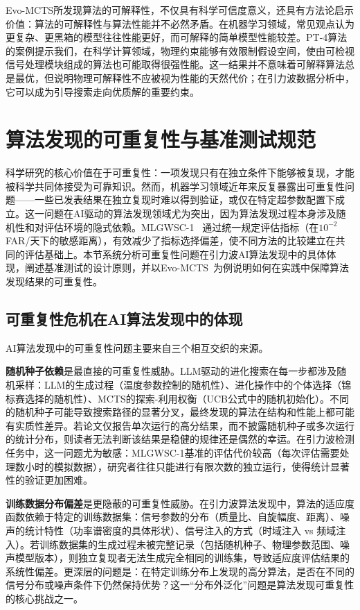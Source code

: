 Evo-MCTS所发现算法的可解释性，不仅具有科学可信度意义，还具有方法论启示价值：算法的可解释性与算法性能并不必然矛盾。在机器学习领域，常见观点认为更复杂、更黑箱的模型往往性能更好，而可解释的简单模型性能较差。PT-4算法的案例提示我们，在科学计算领域，物理约束能够有效限制假设空间，使由可检视信号处理模块组成的算法也可能取得很强性能。这一结果并不意味着可解释算法总是最优，但说明物理可解释性不应被视为性能的天然代价；在引力波数据分析中，它可以成为引导搜索走向优质解的重要约束。

\section{算法发现的可重复性与基准测试规范}

科学研究的核心价值在于可重复性：一项发现只有在独立条件下能够被复现，才能被科学共同体接受为可靠知识。然而，机器学习领域近年来反复暴露出可重复性问题——一些已发表结果在独立复现时难以得到验证，或仅在特定超参数配置下成立。这一问题在AI驱动的算法发现领域尤为突出，因为算法发现过程本身涉及随机性和对评估环境的隐式依赖。MLGWSC-1~\cite{schafer2023mlgwsc1} 通过统一规定评估指标（在$10^{-2}$ FAR/天下的敏感距离），有效减少了指标选择偏差，使不同方法的比较建立在共同的评估基础上。本节系统分析可重复性问题在引力波AI算法发现中的具体体现，阐述基准测试的设计原则，并以Evo-MCTS~\cite{wang2025evomcts}为例说明如何在实践中保障算法发现结果的可重复性。

\subsection*{可重复性危机在AI算法发现中的体现}

AI算法发现中的可重复性问题主要来自三个相互交织的来源。

\textbf{随机种子依赖}是最直接的可重复性威胁。LLM驱动的进化搜索在每一步都涉及随机采样：LLM的生成过程（温度参数控制的随机性）、进化操作中的个体选择（锦标赛选择的随机性）、MCTS的探索-利用权衡（UCB公式中的随机初始化）。不同的随机种子可能导致搜索路径的显著分叉，最终发现的算法在结构和性能上都可能有实质性差异。若论文仅报告单次运行的高分结果，而不披露随机种子或多次运行的统计分布，则读者无法判断该结果是稳健的规律还是偶然的幸运。在引力波检测任务中，这一问题尤为敏感：MLGWSC-1基准的评估代价较高（每次评估需要处理数小时的模拟数据），研究者往往只能进行有限次数的独立运行，使得统计显著性的验证更加困难。

\textbf{训练数据分布偏差}是更隐蔽的可重复性威胁。在引力波算法发现中，算法的适应度函数依赖于特定的训练数据集：信号参数的分布（质量比、自旋幅度、距离）、噪声的统计特性（功率谱密度的具体形状）、信号注入的方式（时域注入 vs 频域注入）。若训练数据集的生成过程未被完整记录（包括随机种子、物理参数范围、噪声模型版本），则独立复现者无法生成完全相同的训练集，导致适应度评估结果的系统性偏差。更深层的问题是：在特定训练分布上发现的高分算法，是否在不同的信号分布或噪声条件下仍然保持优势？这一“分布外泛化”问题是算法发现可重复性的核心挑战之一。

